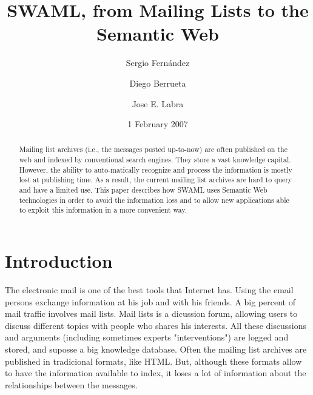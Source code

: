 \documentclass{llncs}
\begin{document}
\title{SWAML, from Mailing Lists to the Semantic Web}


\author{
Sergio Fern\'andez \and Diego Berrueta \and Jose E. Labra
}




\date{1 February 2007}

\maketitle

\begin{abstract}

Mailing list archives (i.e., the messages posted up-to-now) are often published 
on the web and indexed by conventional search engines. They store a vast 
knowledge capital. However, the ability to auto-matically recognize and process 
the information is mostly lost at publishing time. As a result, the current 
mailing list archives are hard to query and have a limited use. This paper 
describes how SWAML uses Semantic Web technologies in order to avoid the
information loss and to allow new applications able to exploit this 
information in a more convenient way.

\end{abstract}

\section{Introduction}

The electronic mail is one of the best tools that Internet has. Using the
email persons exchange information at his job and with his friends. A big 
percent of mail traffic involves mail lists. Mail lists is a dicussion forum,
allowing users to discuss different topics with people who shares his interests.
All these discussions and arguments (including sometimes experts "interventions") 
are logged and stored, and suposse a big knowledge database. Often the mailing 
list archives are published in tradicional formats, like HTML. But, although 
these formats allow to have the information available to index, it loses a lot 
of information about the relationships between the messages.
\end{document}
